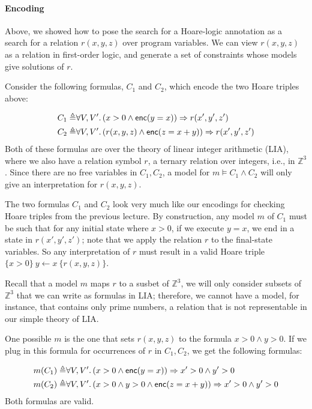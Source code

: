 \documentclass{amsart}
\theoremstyle{definition}
\theoremstyle{remark}
\numberwithin{equation}{section}
\begin{document}
\paragraph{Encoding}
Above, we showed how to pose the search for a Hoare-logic
annotation
as a search for a relation $r(x,y,z)$ over program variables.
We can view $r(x,y,z)$ as a relation in first-order
logic, and generate a set of constraints whose
models give solutions of $r$.

Consider the following formulas, $C_1$ and $C_2$,
which encode the two Hoare triples above:

\begin{align*}
C_1 \triangleq&
  \forall V,V' \ldotp (x > 0 \land \enc(y = x)) \Rightarrow r(x',y',z')\\
%
C_2 \triangleq&
  \forall V,V' \ldotp   \left(r(x,y,z) \land
  \enc(z = x + y)\right) \Rightarrow r(x',y',z')
\end{align*}
Both of these formulas
are over the theory of linear integer arithmetic (LIA),
where we also have a relation symbol $r$,
a ternary relation over integers, i.e., in $\mathbb{Z}^3$.
Since there are no free variables in $C_1,C_2$,
a model for $m \models C_1 \land C_2$
will only give an interpretation for $r(x,y,z)$.

The two formulas $C_1$ and $C_2$
look very much like our encodings for checking Hoare triples
from the previous lecture.
By construction, any model $m$ of $C_1$
must be such that for any initial state where $x > 0$,
if we execute $y = x$, we end in a state in $r(x',y',z')$;
note that we apply the relation $r$ to the final-state variables.
So any interpretation of $r$ must result in a valid Hoare triple
$\{x> 0\} ~ y \gets x ~ \{r(x,y,z)\}$.

Recall that a model $m$ maps $r$ to a susbet of $\mathbb{Z}^3$,
we will only consider subsets of $\mathbb{Z}^3$
that we can write as formulas in LIA;
therefore, we cannot have a model, for instance,
that contains only prime numbers, a relation that is not representable in our simple theory of LIA.

One possible $m$ is the one that sets $r(x,y,z)$
to the formula $x > 0 \land y > 0$.
If we plug in this formula for occurrences of
$r$ in $C_1, C_2$, we get the following formulas:

\begin{align*}
m(C_1) \triangleq&
  \forall V,V' \ldotp (x > 0 \land \enc(y = x)) \Rightarrow x' > 0 \land y' > 0\\
%
m(C_2) \triangleq&
  \forall V,V' \ldotp   \left(x > 0 \land y > 0 \land
  \enc(z = x + y)\right) \Rightarrow x' > 0 \land y' > 0
\end{align*}
Both formulas are valid.
\end{document}

